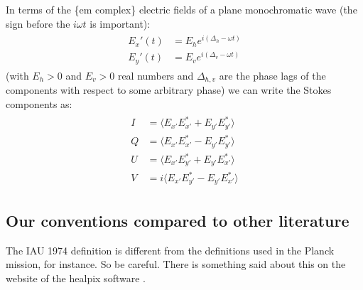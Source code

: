 \documentclass[letterpaper,10pt,english]{sphinxmanual}
\begin{document}
In terms of the \{em complex\} electric fields of a plane monochromatic wave
(the sign before the \(i\omega t\) is important):
\begin{equation*}
\begin{split}\begin{split}
E_x'(t) &= E_h e^{i(\Delta_h-\omega t)}\\
E_y'(t) &= E_v e^{i(\Delta_v-\omega t)}
\end{split}\end{split}
\end{equation*}
(with \(E_h>0\) and \(E_v>0\) real numbers and \(\Delta_{h,v}\) are
the phase lags of the components with respect to some arbitrary phase) we can
write the Stokes components as:
\begin{equation*}
\begin{split}\begin{split}
I &= \langle E_{x'}E_{x'}^{*} + E_{y'}E_{y'}^{*}   \rangle\\
Q &= \langle E_{x'}E_{x'}^{*} - E_{y'}E_{y'}^{*}   \rangle\\
U &= \langle E_{x'}E_{y'}^{*} + E_{y'}E_{x'}^{*}   \rangle\\
V &= i\langle E_{x'}E_{y'}^{*} - E_{y'}E_{x'}^{*}  \rangle
\end{split}\end{split}
\end{equation*}

\subsection{Our conventions compared to other literature}
\label{\detokenize{dustradtrans:our-conventions-compared-to-other-literature}}\label{\detokenize{dustradtrans:sec-stokes-convent-differences}}
The IAU 1974 definition is different from the definitions used in the
Planck mission, for instance. So be careful. There is something said about
this on the website of the healpix software
 .
\end{document}
